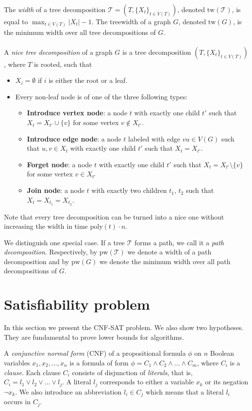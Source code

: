 \documentclass[en]{pracamgr}
\theoremstyle{definition}
\newcommand{\cnfsat}{{\sc CNF-SAT}}
\begin{document}
The \emph{width} of a tree decomposition $\mathcal{T} = (T,\{X_t\}_{t\in V(T)})$, denoted $\textrm{tw}(\mathcal{T})$, is equal to $\max_{t \in V(T)} |X_t| - 1$. The treewidth of a graph $G$, denoted $\textrm{tw}(G)$, is the minimum width over all tree decompositions of $G$.
\\\\
A \emph{nice tree decomposition} of a graph $G$ is a tree decomposition $(T, \{X_t\}_{t \in V(T)})$, where $T$ is rooted, such that
\begin{itemize}
	\item $X_i = \emptyset$ if $i$ is either the root or a leaf.
	\item Every non-leaf node is of one of the three following types:
	\begin{itemize}
		\item \textbf{Introduce vertex node}: a node $t$ with exactly one child $t'$ such that $X_t = X_{t'} \cup \{v\}$ for some vertex $v \notin X_{t'}$.
		\item \textbf{Introduce edge node}: a node $t$ labeled with edge $vu \in V(G)$ such that $u,v \in X_t$ with exactly one child $t'$ such that $X_t = X_{t'}$.
		\item \textbf{Forget node}: a node $t$ with exactly one child $t'$ such that $X_t = X_{t'} \setminus \{v\}$ for some vertex $v \in X_{t'}$
		\item \textbf{Join node}: a node $t$ with exactly two children $t_1$, $t_2$ such that $X_t = X_{t_1} = X_{t_2}$.
	\end{itemize}
\end{itemize}
Note that every tree decomposition can be turned into a nice one without increasing the width in time $\textrm{poly}(t) \cdot n$.

We distinguish one special case. If a tree $\mathcal{T}$ forms a path, we call it a \emph{path decomposition}. Respectively, by $\textrm{pw}(\mathcal{T})$ we denote a width of a path decomposition and by $\textrm{pw}(G)$ we denote the minimum width over all path decompositions of $G$.

\section{Satisfiability problem}

In this section we present the \cnfsat{} problem. We also show two hypotheses. They are fundamental to prove lower bounds for algorithms. 

A \textit{conjunctive normal form} (CNF) of a propositional formula $\phi$ on $n$ Boolean variables $x_1,x_2,...,x_n$ is a formula of form $\phi=C_1 \land C_2 \land ... \land C_m$, where $C_i$ is a \textit{clause}. Each clause $C_i$ consists of disjunction of \textit{literals}, that is, $C_i=l_1 \lor l_2 \lor ... \lor l_j$. A literal $l_j$ corresponds to either a variable $x_k$ or its negation $\neg x_k$. We also introduce an abbreviation $l_i \in C_j$ which means that a literal $l_i$ occurs in $C_j$.
\end{document}
